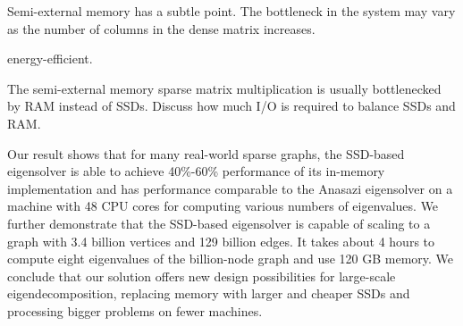 Semi-external memory has a subtle point. The bottleneck in the system may
vary as the number of columns in the dense matrix increases.


energy-efficient.

The semi-external memory sparse matrix multiplication is usually bottlenecked
by RAM instead of SSDs. Discuss how much I/O is required to balance SSDs and
RAM.

Our result shows that for many real-world sparse graphs, the SSD-based
eigensolver is able to achieve 40\%-60\%
performance of its in-memory implementation and has performance comparable to
the Anasazi eigensolver on a machine with 48 CPU cores for computing various
numbers of eigenvalues. We further demonstrate that the SSD-based eigensolver
is capable of scaling to a graph with 3.4 billion vertices and 129 billion edges.
It takes about 4 hours to compute eight eigenvalues of the billion-node graph
and use 120 GB memory. We conclude that our solution offers new design
possibilities for large-scale eigendecomposition, replacing memory with larger
and cheaper SSDs and processing bigger problems on fewer machines.
